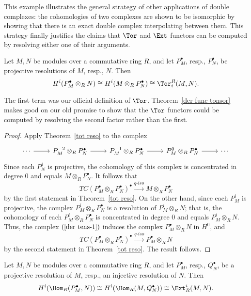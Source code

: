 This example illustrates the general strategy of other applications of double
complexes: the cohomologies of two complexes are shown to be isomorphic by
showing that there is an exact double complex interpolating between them. This strategy finally justifies the claims that $\Tor$ and $\Ext$ functors can be computed by resolving either one of their arguments.
\begin{theorem}\label{der func tonsor}
Let $M,N$ be modules over a commutative ring $R$, and let $P^\bullet_M$, resp., $P^\bullet_N$, be projective resolutions of $M$, resp., $N$. Then
\[H^i(P^\bullet_M\otimes_{R}N)\cong H^i(M\otimes_{R}P_N^\bullet)\cong\Tor^R_i(M,N).\]
\end{theorem}
The first term was our official definition of $\Tor$. Theorem~\ref{der func tonsor} makes good on our old promise to show that the $\Tor$ functors could be computed by resolving the second factor rather than the first.
\begin{proof}
Apply Theorem~\ref{tot reso} to the complex
\begin{equation}\label{der tens-1}
\begin{tikzcd}
\cdots\ar[r]&P^{-2}_M\otimes_{R}P_N^\bullet\ar[r]&P^{-1}_M\otimes_{R}P_N^\bullet\ar[r]&P^{0}_M\otimes_{R}P_N^\bullet\ar[r]&\cdots
\end{tikzcd}
\end{equation}
Since each $P^j_N$ is projective, the cohomology of this complex is concentrated in degree $0$ and equals $M\otimes_{R}P^\bullet_N$. It follows that
\[TC(P_M^\bullet\otimes_{R}P_N^\bullet)^\bullet\stackrel{q\text{-}iso}{\longrightarrow}M\otimes_{R}P^\bullet_N\]
by the first statement in Theorem~\ref{tot reso}. On the other hand, since each $P^i_M$ is projective, the complex $P^i_M\otimes_{R}P_N^\bullet$ is a resolution of $P^i_M\otimes_{R}N$; that is, the cohomology of each $P^i_M\otimes_{R}P_N^\bullet$ is concentrated in degree $0$ and equals $P^i_M\otimes_{R}N$. Thus, the
complex $(\ref{der tens-1})$ induces the complex $P^\bullet_M\otimes_{R}N$ in $H^0$, and
\[TC(P_M^\bullet\otimes_{R}P_N^\bullet)^\bullet\stackrel{q\text{-}iso}{\longrightarrow}P^\bullet_M\otimes_{R}N\]
by the second statement in Theorem~\ref{tot reso}. The result follows.
\end{proof}
\begin{theorem}
Let $M,N$ be modules over a commutative ring $R$, and let $P_M^\bullet$,
resp., $Q^\bullet_N$, be a projective resolution of $M$, resp., an injective resolution of $N$. Then
\[H^i(\Hom_R(P^\bullet_M,N))\cong H^i(\Hom_R(M,Q^\bullet_N))\cong\Ext^i_R(M,N).\]
\end{theorem}
